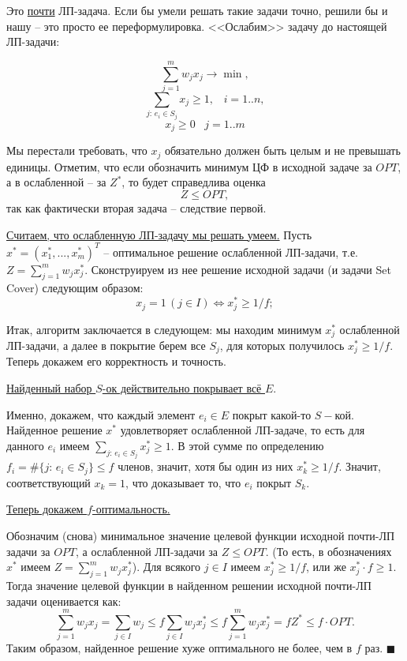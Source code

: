 Это \underline{почти} ЛП-задача. Если бы умели решать такие задачи точно, решили бы и нашу -- это просто ее переформулировка. <<Ослабим>> задачу до настоящей ЛП-задачи:

$$\sum^m_{j=1} w_j x_j \rightarrow \min,$$
$$\sum_{j:\, e_i \in S_j} x_j \geq 1, \;\;\; i=1..n,$$
$$x_j \geq 0 \;\;\; j=1..m$$

Мы перестали требовать, что $x_j$ обязательно должен быть целым и не превышать единицы. Отметим, что если обозначить минимум ЦФ в исходной задаче за $OPT$, а в ослабленной -- за $Z^*$, то будет справедлива оценка $$Z \leq OPT,$$ так как фактически вторая задача -- следствие первой.


\underline{Считаем, что ослабленную ЛП-задачу мы решать умеем.} Пусть $x^* = (x_1^*, ..., x_m^*)^T$ -- оптимальное решение ослабленной ЛП-задачи, т.е. $Z = \sum\limits^m_{j=1} w_j x_j^*$. Сконструируем из нее решение исходной задачи (и задачи Set Cover) следующим образом:
$$x_j = 1\, (j \in I) \iff x_j^* \geq 1/f;$$

Итак, алгоритм заключается в следующем: мы находим минимум $x_j^*$ ослабленной ЛП-задачи, а далее в покрытие берем все $S_j$, для которых получилось $x_j^* \geq 1/f$. Теперь докажем его корректность и точность.

\underline{Найденный набор $S$-ок действительно покрывает всё $E$}. 

Именно, докажем, что каждый элемент $e_i \in E$ покрыт какой-то $S-$кой. Найденное решение $x^*$ удовлетворяет ослабленной ЛП-задаче, то есть для данного $e_i$ имеем $\sum\limits_{j: \, e_i \in S_j} x_j^* \geq 1$. В этой сумме по определению $f_i = \#\{j: \, e_i \in S_j\} \leq f$ членов, значит, хотя бы один из них $x_k^*\geq 1/f$. Значит, соответствующий $x_k = 1$, что доказывает то, что $e_i$ покрыт $S_k$. 

\underline{Теперь докажем $f$-оптимальность.} 

Обозначим (снова) минимальное значение целевой функции исходной почти-ЛП задачи за $OPT$, а ослабленной ЛП-задачи за $Z \leq OPT$.  (То есть, в обозначениях $x^*$ имеем $Z = \sum\limits^m_{j=1} w_j x_j^*$). Для всякого $j\in I$ имеем $x_j^* \geq 1/f$, или же $x_j^*\cdot f \geq 1$. Тогда значение целевой функции в найденном решении исходной почти-ЛП задачи оценивается как:
$$\sum^m_{j=1} w_j x_j = \sum_{j \in I} w_j \leq f \sum_{j \in I} w_j x_j^* \leq f \sum^m_{j=1} w_j x_j^* = f Z^* \leq f \cdot OPT.$$ Таким образом, найденное решение хуже оптимального не более, чем в $f$ раз. $\blacksquare$


